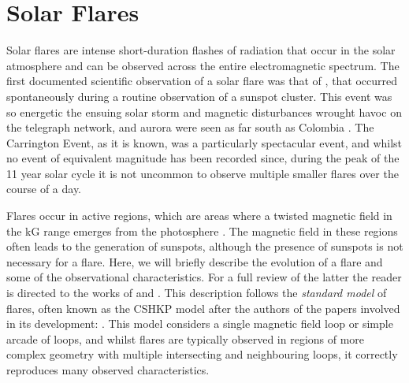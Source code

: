 \section{Solar Flares}

Solar flares are intense short-duration flashes of radiation that occur in the solar atmosphere and can be observed across the entire electromagnetic spectrum.
The first documented scientific observation of a solar flare was that of \citet{Carrington1859}, that occurred spontaneously during a routine observation of a sunspot cluster.
This event was so energetic the ensuing solar storm and magnetic disturbances wrought havoc on the telegraph network, and aurora were seen as far south as Colombia \citep{MorenoCardenas2016}.
The Carrington Event, as it is known, was a particularly spectacular event, and whilst no event of equivalent magnitude has been recorded since, during the peak of the 11 year solar cycle it is not uncommon to observe multiple smaller flares over the course of a day.

Flares occur in active regions, which are areas where a twisted magnetic field in the kG range emerges from the photosphere \citep[For a review of active region evolution see][]{VanDriel-Gesztelyi2015}.
The magnetic field in these regions often leads to the generation of sunspots, although the presence of sunspots is not necessary for a flare.
Here, we will briefly describe the evolution of a flare and some of the observational characteristics.
For a full review of the latter the reader is directed to the works of \citet{Benz2008} and \citet{Fletcher2011}.
This description follows the \emph{standard model} of flares, often known as the CSHKP model after the authors of the papers involved in its development: \citet{Carmichael1964,Sturrock1966,Hirayama1974,Kopp1976}.
This model considers a single magnetic field loop or simple arcade of loops, and whilst flares are typically observed in regions of more complex geometry with multiple intersecting and neighbouring loops, it correctly reproduces many observed characteristics.

